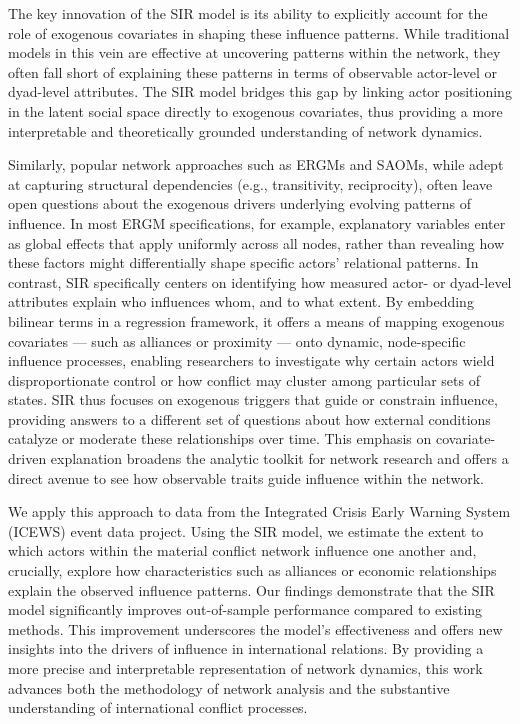 The key innovation of the SIR model is its ability to explicitly account for the role of exogenous covariates in shaping these influence patterns. While traditional models in this vein are effective at uncovering patterns within the network, they often fall short of explaining these patterns in terms of observable actor-level or dyad-level attributes. The SIR model bridges this gap by linking actor positioning in the latent social space directly to exogenous covariates, thus providing a more interpretable and theoretically grounded understanding of network dynamics.

Similarly, popular network approaches such as ERGMs and SAOMs, while adept at capturing structural dependencies (e.g., transitivity, reciprocity), often leave open questions about the exogenous drivers underlying evolving patterns of influence. In most ERGM specifications, for example, explanatory variables enter as global effects that apply uniformly across all nodes, rather than revealing how these factors might differentially shape specific actors' relational patterns. In contrast, SIR specifically centers on identifying how measured actor- or dyad-level attributes explain who influences whom, and to what extent. By embedding bilinear terms in a regression framework, it offers a means of mapping exogenous covariates --- such as alliances or proximity --- onto dynamic, node-specific influence processes, enabling researchers to investigate why certain actors wield disproportionate control or how conflict may cluster among particular sets of states. SIR thus focuses on exogenous triggers that guide or constrain influence, providing answers to a different set of questions about how external conditions catalyze or moderate these relationships over time. This emphasis on covariate-driven explanation broadens the analytic toolkit for network research and offers a direct avenue to see how observable traits guide influence within the network.

We apply this approach to data from the Integrated Crisis Early Warning System (ICEWS) event data project. Using the SIR model, we estimate the extent to which actors within the material conflict network influence one another and, crucially, explore how characteristics such as alliances or economic relationships explain the observed influence patterns. Our findings demonstrate that the SIR model significantly improves out-of-sample performance compared to existing methods. This improvement underscores the model's effectiveness and offers new insights into the drivers of influence in international relations. By providing a more precise and interpretable representation of network dynamics, this work advances both the methodology of network analysis and the substantive understanding of international conflict processes.

